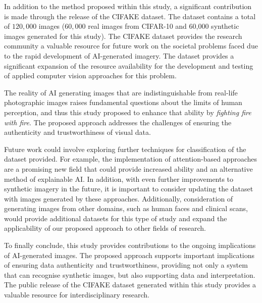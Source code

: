 \documentclass{article}
\begin{document}
In addition to the method proposed within this study, a significant contribution is made through the release of the CIFAKE dataset. The dataset contains a total of $120,000$ images ($60,000$ real images from CIFAR-10 and 60,000 synthetic images generated for this study). The CIFAKE dataset provides the research community a valuable resource for future work on the societal problems faced due to the rapid development of AI-generated imagery. The dataset provides a significant expansion of the resource availability for the development and testing of applied computer vision approaches for this problem.

The reality of AI generating images that are indistinguishable from real-life photographic images raises fundamental questions about the limits of human perception, and thus this study proposed to enhance that ability by \textit{fighting fire with fire}. The proposed approach addresses the challenges of ensuring the authenticity and trustworthiness of visual data. 

Future work could involve exploring further techniques for classification of the dataset provided. For example, the implementation of attention-based approaches are a promising new field that could provide increased ability and an alternative method of explainable AI. In addition, with even further improvements to synthetic imagery in the future, it is important to consider updating the dataset with images generated by these approaches. Additionally, consideration of generating images from other domains, such as human faces and clinical scans, would provide additional datasets for this type of study and expand the applicability of our proposed approach to other fields of research. 

To finally conclude, this study provides contributions to the ongoing implications of AI-generated images. The proposed approach supports important implications of ensuring data authenticity and trustworthiness, providing not only a system that can recognise synthetic images, but also supporting data and interpretation. The public release of the CIFAKE dataset generated within this study provides a valuable resource for interdisciplinary research. 




\end{document}
